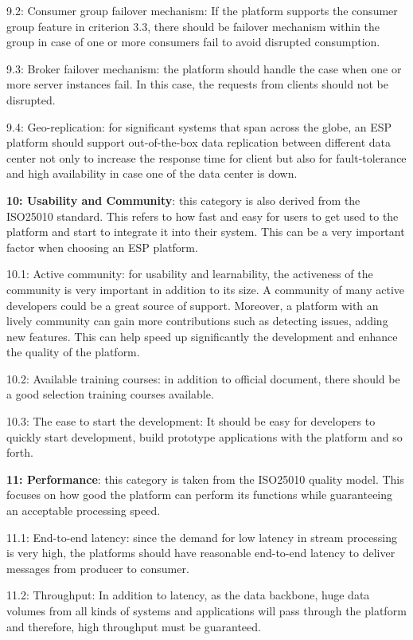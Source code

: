 9.2: Consumer group failover mechanism: If the platform supports the consumer group feature in criterion 3.3, there should be failover mechanism within the group in case of one or more consumers fail to avoid disrupted consumption.

9.3: Broker failover mechanism: the platform should handle the case when one or more server instances fail. In this case, the requests from clients should not be disrupted. 

9.4: Geo-replication: for significant systems that span across the globe, an ESP platform should support out-of-the-box data replication between different data center not only to increase the response time for client but also for fault-tolerance and high availability in case one of the data center is down.

\textbf{10: Usability and Community}: this category is also derived from the ISO25010 standard. This refers to how fast and easy for users to get used to the platform and start to integrate it into their system. This can be a very important factor when choosing an ESP platform. 

10.1: Active community: for usability and learnability, the activeness of the community is very important in addition to its size. A community of many active developers could be a great source of support. Moreover, a platform with an lively community can gain more contributions such as detecting issues, adding new features. This can help speed up significantly the development and enhance the quality of the platform.

10.2: Available training courses: in addition to official document, there should be a good selection training courses available. 

10.3: The ease to start the development: It should be easy for developers to quickly start development, build prototype applications with the platform and so forth.

\textbf{11: Performance}: this category is taken from the ISO25010 quality model. This focuses on how good the platform can perform its functions while guaranteeing an acceptable processing speed. 

11.1: End-to-end latency: since the demand for low latency in stream processing is very high, the platforms should have reasonable end-to-end latency to deliver messages from producer to consumer. 

11.2: Throughput: In addition to latency, as the data backbone, huge data volumes from all kinds of systems and applications will pass through the platform and therefore, high throughput must be guaranteed.

